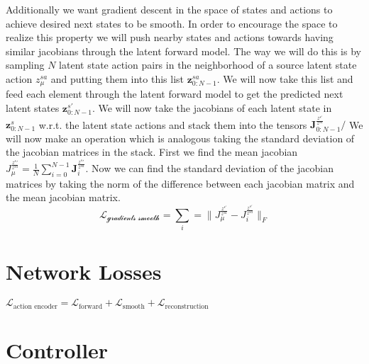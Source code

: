 \documentclass{article}
\begin{document}
Additionally we want gradient descent in the space of states and actions to achieve desired next states to be smooth.
In order to encourage the space to realize this property we will push nearby states and actions towards having similar jacobians through the latent forward model.
The way we will do this is by sampling \(N\) latent state action pairs in the neighborhood of a source latent state action \(z^{sa}_\mu\) and putting them into this list \(\mathbf{z}^{sa}_{0:N-1}\).
We will now take this list and feed each element through the latent forward model to get the predicted next latent states \(\mathbf{z}^{s'}_{0:N-1}\).
We will now take the jacobians of each latent state in \(\mathbf{z}^{s}_{0:N-1}\) w.r.t. the latent state actions and stack them into the tensors \(\mathbf{J}^{\frac{z^{s'}}{z^{sa}}}_{0:N-1}/\)
We will now make an operation which is analogous taking the standard deviation of the jacobian matrices in the stack.
First we find the mean jacobian \(J^{\frac{{z^s}'}{z^{sa}}}_\mu = \frac{1}{N}\sum\limits_{i=0}^{N-1} \mathbf{J}^{\frac{{z^s}'}{z^{sa}}}_{i}\).
Now we can find the standard deviation of the jacobian matrices by taking the norm of the difference between each jacobian matrix and the mean jacobian matrix.
$$\mathcal{L_\text{gradients smooth}}= \sum\limits_i = \|J^{\frac{z^{s'}}{z^{sa}}}_\mu - J^{\frac{z^{s'}}{z^{sa}}}_i\|_F$$


\section{Network Losses}

$\mathcal{L}_\text{action encoder}=\mathcal{L}_\text{forward} + \mathcal{L}_\text{smooth}+\mathcal{L}_\text{reconstruction}$



\section{Controller}
\end{document}
